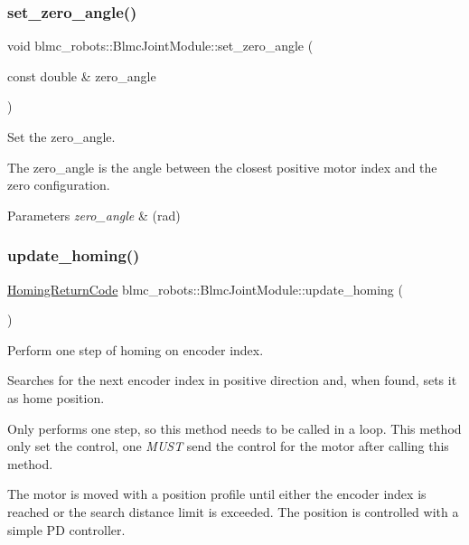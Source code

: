 \subsubsection{\texorpdfstring{set\+\_\+zero\+\_\+angle()}{set\_zero\_angle()}}
{\footnotesize\ttfamily void blmc\+\_\+robots\+::\+Blmc\+Joint\+Module\+::set\+\_\+zero\+\_\+angle (\begin{DoxyParamCaption}\item[{const double \&}]{zero\+\_\+angle }\end{DoxyParamCaption})}



Set the zero\+\_\+angle. 

The zero\+\_\+angle is the angle between the closest positive motor index and the zero configuration.


\begin{DoxyParams}{Parameters}
{\em zero\+\_\+angle} & (rad) \\
\hline
\end{DoxyParams}
\mbox{\label{classblmc__robots_1_1BlmcJointModule_abb2712542f3c340bc0ecf76bd343b6b3}} 
\subsubsection{\texorpdfstring{update\+\_\+homing()}{update\_homing()}}
{\footnotesize\ttfamily \hyperlink{blmc__joint__module_8hpp_aa1075809042ff261e4b0a20d161448b6}{Homing\+Return\+Code} blmc\+\_\+robots\+::\+Blmc\+Joint\+Module\+::update\+\_\+homing (\begin{DoxyParamCaption}{ }\end{DoxyParamCaption})}



Perform one step of homing on encoder index. 

Searches for the next encoder index in positive direction and, when found, sets it as home position.

Only performs one step, so this method needs to be called in a loop. This method only set the control, one {\itshape M\+U\+ST} send the control for the motor after calling this method.

The motor is moved with a position profile until either the encoder index is reached or the search distance limit is exceeded. The position is controlled with a simple PD controller.

